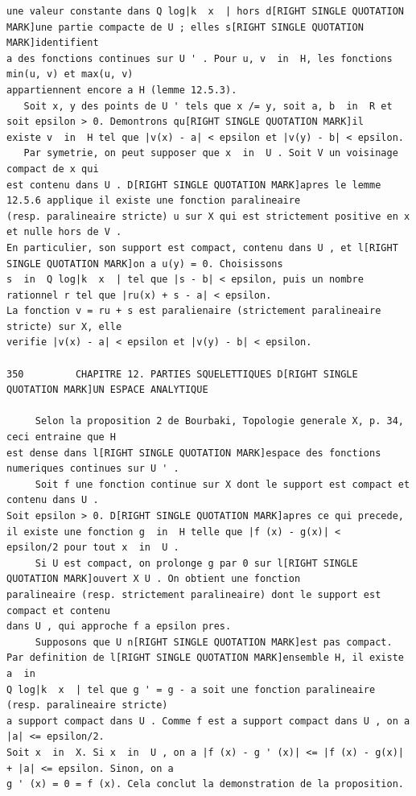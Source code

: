 \documentclass[
  11pt,
]{article}
\begin{document}
\begin{lstlisting}
une valeur constante dans Q log|k  x  | hors d[RIGHT SINGLE QUOTATION MARK]une partie compacte de U ; elles s[RIGHT SINGLE QUOTATION MARK]identifient
a des fonctions continues sur U ' . Pour u, v  in  H, les fonctions min(u, v) et max(u, v)
appartiennent encore a H (lemme 12.5.3).
   Soit x, y des points de U ' tels que x /= y, soit a, b  in  R et soit epsilon > 0. Demontrons qu[RIGHT SINGLE QUOTATION MARK]il
existe v  in  H tel que |v(x) - a| < epsilon et |v(y) - b| < epsilon.
   Par symetrie, on peut supposer que x  in  U . Soit V un voisinage compact de x qui
est contenu dans U . D[RIGHT SINGLE QUOTATION MARK]apres le lemme 12.5.6 applique il existe une fonction paralineaire
(resp. paralineaire stricte) u sur X qui est strictement positive en x et nulle hors de V .
En particulier, son support est compact, contenu dans U , et l[RIGHT SINGLE QUOTATION MARK]on a u(y) = 0. Choisissons
s  in  Q log|k  x  | tel que |s - b| < epsilon, puis un nombre rationnel r tel que |ru(x) + s - a| < epsilon.
La fonction v = ru + s est paralienaire (strictement paralineaire stricte) sur X, elle
verifie |v(x) - a| < epsilon et |v(y) - b| < epsilon.

350         CHAPITRE 12. PARTIES SQUELETTIQUES D[RIGHT SINGLE QUOTATION MARK]UN ESPACE ANALYTIQUE

     Selon la proposition 2 de Bourbaki, Topologie generale X, p. 34, ceci entraine que H
est dense dans l[RIGHT SINGLE QUOTATION MARK]espace des fonctions numeriques continues sur U ' .
     Soit f une fonction continue sur X dont le support est compact et contenu dans U .
Soit epsilon > 0. D[RIGHT SINGLE QUOTATION MARK]apres ce qui precede, il existe une fonction g  in  H telle que |f (x) - g(x)| <
epsilon/2 pour tout x  in  U .
     Si U est compact, on prolonge g par 0 sur l[RIGHT SINGLE QUOTATION MARK]ouvert X U . On obtient une fonction
paralineaire (resp. strictement paralineaire) dont le support est compact et contenu
dans U , qui approche f a epsilon pres.
     Supposons que U n[RIGHT SINGLE QUOTATION MARK]est pas compact. Par definition de l[RIGHT SINGLE QUOTATION MARK]ensemble H, il existe a  in 
Q log|k  x  | tel que g ' = g - a soit une fonction paralineaire (resp. paralineaire stricte)
a support compact dans U . Comme f est a support compact dans U , on a |a| <= epsilon/2.
Soit x  in  X. Si x  in  U , on a |f (x) - g ' (x)| <= |f (x) - g(x)| + |a| <= epsilon. Sinon, on a
g ' (x) = 0 = f (x). Cela conclut la demonstration de la proposition.


\end{lstlisting}
\end{document}
